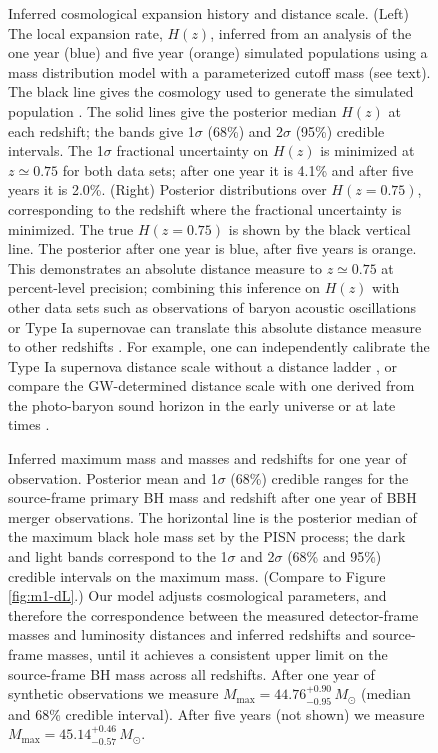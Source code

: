 \documentclass[modern]{aastex62}
\newcommand{\MMax}{M_\mathrm{max}}
\newcommand{\MMaxOneYear}{44.76^{+0.90}_{-0.95} \, \MSun{}}
\newcommand{\MMaxFiveYear}{45.14^{+0.46}_{-0.57} \, \MSun{}}
\newcommand{\SigmaHPvtOneYear}{4.1\%}
\newcommand{\SigmaHPvtFiveYear}{2.0\%}
\newcommand{\zpivot}{0.75}
\newcommand{\MSun}{M_\odot}
\begin{document}
\begin{figure}
%
  \caption{\label{fig:Hz} Inferred cosmological expansion history and distance
  scale.  (Left) The local expansion rate, $H(z)$, inferred from an analysis of
  the one year (blue) and five year (orange) simulated populations using a mass
  distribution model with a parameterized cutoff mass (see text).  The black
  line gives the cosmology used to generate the simulated population \citep[TT,
  TE, EE + lowP + lensing + ext]{Planck2016}.  The solid lines give the
  posterior median $H(z)$ at each redshift; the bands give 1$\sigma$ (68\%) and
  2$\sigma$ (95\%) credible intervals.  The 1$\sigma$ fractional uncertainty on
  $H(z)$ is minimized at $z \simeq \zpivot{}$ for both data sets; after one year
  it is \SigmaHPvtOneYear{} and after five years it is \SigmaHPvtFiveYear{}.
  (Right) Posterior distributions over $H\left(z = \zpivot{}\right)$,
  corresponding to the redshift where the fractional uncertainty is minimized.
  The true $H\left( z = \zpivot{} \right)$ is shown by the black vertical line.
  The posterior after one year is blue, after five years is orange.  This
  demonstrates an absolute distance measure to $z \simeq \zpivot{}$ at
  percent-level precision; combining this inference on $H(z)$ with other data
  sets such as observations of baryon acoustic oscillations \citep{BOSS2015} or
  Type Ia supernovae \citep{Scolnic2018} can translate this absolute distance
  measure to other redshifts \citep{Feeney2019}. For example, one can
  independently calibrate the Type Ia supernova distance scale without a
  distance ladder \citep{Feeney2019,Scolnic2018}, or compare the
  \ac{GW}-determined distance scale with one derived from the photo-baryon sound
  horizon \citep{Aylor2019} in the early universe \citep{Planck2016} or at late
  times \citep{BOSS2015}.}
%
\end{figure}

\begin{figure}
%
  \caption{\label{fig:mass-correction} Inferred maximum mass and masses and
  redshifts for one year of observation.  Posterior mean and 1$\sigma$ (68\%)
  credible ranges for the source-frame primary \ac{BH} mass and redshift after
  one year of \ac{BBH} merger observations.  The horizontal line is the
  posterior median of the maximum black hole mass set by the PISN process; the
  dark and light bands correspond to the 1$\sigma$ and 2$\sigma$ (68\% and 95\%)
  credible intervals on the maximum mass.  (Compare to Figure \ref{fig:m1-dL}.)
  Our model adjusts cosmological parameters, and therefore the correspondence
  between the measured detector-frame masses and luminosity distances and
  inferred redshifts and source-frame masses, until it achieves a consistent
  upper limit on the source-frame \ac{BH} mass across all redshifts.  After one
  year of synthetic observations we measure $\MMax{} = \MMaxOneYear{}$ (median
  and 68\% credible interval).  After five years (not shown) we measure $\MMax{}
  = \MMaxFiveYear{}$.}
%
\end{figure}
\end{document}
